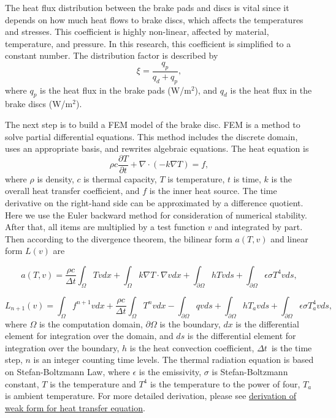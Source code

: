 The heat flux distribution between the brake pads and discs is vital since it depends on how much heat flows to brake discs, which affects the temperatures and stresses. This coefficient is highly non-linear, affected by material, temperature, and pressure. In this research, this coefficient is simplified to a constant number. The distribution factor is described by \cite{rudolf_limpert_brake_1999}
\begin{equation}
    \xi = \frac{q_p}{q_d + q_p},
\end{equation}
where \( q_p \) is the heat flux in the brake pads (W/m$^2$), and \( q_d \) is the heat flux in the brake discs (W/m$^2$). 

The next step is to build a FEM model of the brake disc. FEM is a method to solve partial differential equations. This method includes the discrete domain, uses an appropriate basis, and rewrites algebraic equations. The heat equation is 
\begin{equation}
    \rho c \frac{\partial T}{\partial t} + \nabla \cdot (- k \nabla T) = f,
    \label{heat equation}
\end{equation}
where \( \rho \) is density, \( c \) is thermal capacity, \( T \) is temperature, \( t \) is time, \( k \) is the overall heat transfer coefficient, and \( f \) is the inner heat source. The time derivative on the right-hand side can be approximated by a difference quotient. Here we use the Euler backward method for consideration of numerical stability. After that, all items are multiplied by a test function \( v \) and integrated by part. Then according to the divergence theorem, the bilinear form \( a(T,v) \) and linear form \( L(v) \) are

\begin{equation}
    a(T,v) = \frac{\rho c}{\Delta t} \int_\Omega T v dx + \int_\Omega k \nabla T \cdot \nabla v dx + \int_{\partial \Omega} h T v ds + \int_{\partial \Omega} \epsilon \sigma T^4 v ds,
\end{equation}

\begin{equation}
    L_{n+1}(v) = \int_\Omega f^{n+1} v dx 
    + \frac{\rho c}{\Delta t} \int_\Omega  T^{n} v dx 
    -  \int_{\partial \Omega} q v ds
    +  \int_{\partial \Omega} h T_a v ds 
    + \int_{\partial \Omega} \epsilon \sigma T_a^4 v ds,
\end{equation}
where \( \Omega \) is the computation domain, \( \partial \Omega \) is the boundary, \( dx \) is the differential element for integration over the domain, and \( ds \) is the differential element for integration over the boundary, \( h \) is the heat convection coefficient,  \(\Delta t\)\ is the time step, \(n\) is an integer counting time levels. The thermal radiation equation is based on Stefan-Boltzmann Law, where \( \epsilon \) is the emissivity, \( \sigma \) is Stefan-Boltzmann constant, \(T\) is the temperature and \(T^4\) is the temperature to the power of four, \( T_a \) is ambient temperature. For more detailed derivation, please see  \href{https://github.com/Yanjun96/fenicsx/blob/main/derivation_of_heat_transfer.pdf}{derivation of weak form for heat transfer equation}.

